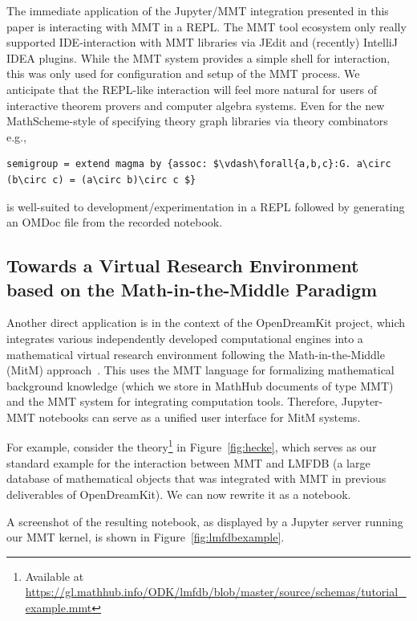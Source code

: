   The immediate application of the Jupyter/MMT integration presented in this paper is interacting with MMT in a REPL.
  The MMT tool ecosystem only really supported IDE-interaction with MMT libraries via JEdit and (recently) IntelliJ IDEA plugins. 
  While the MMT system provides a simple shell for interaction, this was only used for configuration and setup of the MMT process.
  We anticipate that the REPL-like interaction will feel more natural for users of interactive theorem provers and computer algebra systems.
  Even for the new MathScheme-style of specifying theory graph libraries via theory combinators~\cite{ShaRab:dcm19} e.g.,
\begin{lstlisting}[mathescape]
semigroup = extend magma by {assoc: $\vdash\forall{a,b,c}:G. a\circ (b\circ c) = (a\circ b)\circ c $}
\end{lstlisting}
  is well-suited to development/experimentation in a REPL followed by generating an OMDoc file from the recorded notebook.

\subsection{Towards a Virtual Research Environment based on the Math-in-the-Middle Paradigm}


Another direct application is in the context of the OpenDreamKit project, which integrates various independently developed computational engines into a mathematical virtual research environment following the Math-in-the-Middle (MitM) approach~\cite{DehKohKon:iop16}.
This uses the MMT language for formalizing mathematical background knowledge (which we store in MathHub documents of type MMT) and the MMT system for integrating computation tools.
Therefore, Jupyter-MMT notebooks can serve as a unified user interface for MitM systems.

For example, consider the theory\footnote{Available at \url{https://gl.mathhub.info/ODK/lmfdb/blob/master/source/schemas/tutorial_example.mmt}}  in Figure~\ref{fig:hecke}, which serves as our standard example for the interaction between MMT and LMFDB (a large database of mathematical objects that was integrated with MMT in previous deliverables of OpenDreamKit).
We can now rewrite it as a notebook.

A screenshot of the resulting notebook, as displayed by a Jupyter server running our MMT kernel, is shown in Figure~\ref{fig:lmfdbexample}.

